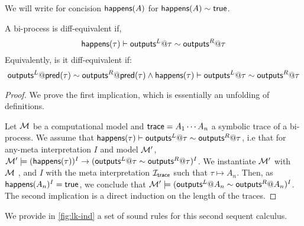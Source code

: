 We will write for concision $\textsf{happens}(A)$ for $\textsf{happens}(A) \sim \textsf{true}$.
\begin{lemma}
  A bi-process is diff-equivalent if,
  \[ \textsf{happens}(\tau)\vdash  \textsf{outputs}^L@\tau \sim \textsf{outputs}^R@\tau\]
  Equivalently, is it diff-equivalent if:
  \[\textsf{outputs}^L@\textsf{pred}(\tau) \sim \textsf{outputs}^R@\textsf{pred}(\tau) \wedge \textsf{happens}(\tau) \vdash \textsf{outputs}^L@\tau \sim \textsf{outputs}^R@\tau\]
\end{lemma}
\begin{proof}We prove the first implication, which is essentially an unfolding of definitions.

  Let $\mathcal{M}$ be a computational model and $\textsf{trace} = A_1 \cdots A_n$ a symbolic trace of a bi-process.
  We assume that  $ \textsf{happens} (\tau)  \vdash \textsf{outputs}^L@\tau \sim \textsf{outputs}^R@\tau$, i.e that for any-meta interpretation $I$ and model $\mathcal{M}'$, $\mathcal{M}' \models (\textsf{happens}(\tau))^I \rightarrow (\textsf{outputs}^L@\tau \sim \textsf{outputs}^R@\tau)^I$. We instantiate $\mathcal{M}'$ with $\mathcal{M}$ , and $I$ with the meta interpretation $\mathcal{I}_{\textsf{trace}}$ such that $\tau \mapsto A_n$. Then, as $\textsf{happens}(A_n)^I = \textsf{true}$, we conclude that $\mathcal{M}' \models  (\textsf{outputs}^L@A_n \sim \textsf{outputs}^R@A_n)^I$.\\

  The second implication is a direct induction on the length of the traces.
  \end{proof}

We provide in \cref{fig:lk-ind} a set of sound rules for this second sequent calculus.

